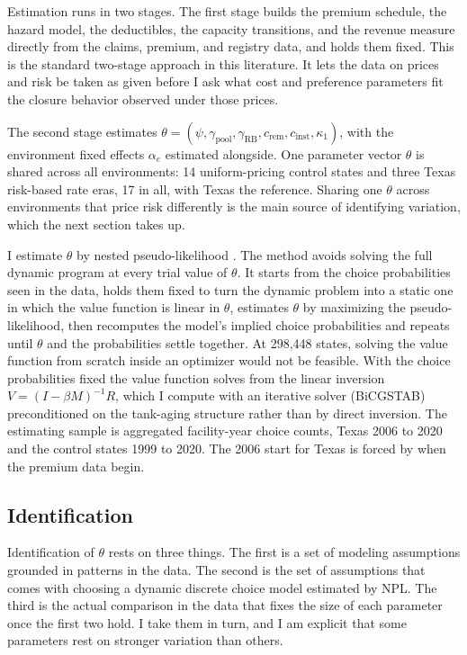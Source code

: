 \documentclass[
  12pt,
]{article}
\begin{document}
Estimation runs in two stages. The first stage builds the premium
schedule, the hazard model, the deductibles, the capacity transitions,
and the revenue measure directly from the claims, premium, and registry
data, and holds them fixed. This is the standard two-stage approach in
this literature. It lets the data on prices and risk be taken as given
before I ask what cost and preference parameters fit the closure
behavior observed under those prices.

The second stage estimates
\(\theta=(\psi,\gamma_{\text{pool}},\gamma_{\text{RB}},c_{\text{rem}},c_{\text{inst}},\kappa_1)\),
with the environment fixed effects \(\alpha_e\) estimated alongside. One
parameter vector \(\theta\) is shared across all environments: 14
uniform-pricing control states and three Texas risk-based rate eras, 17
in all, with Texas the reference. Sharing one \(\theta\) across
environments that price risk differently is the main source of
identifying variation, which the next section takes up.

I estimate \(\theta\) by nested pseudo-likelihood
\citep{aguirregabiria_sequential_2007}. The method avoids solving the
full dynamic program at every trial value of \(\theta\). It starts from
the choice probabilities seen in the data, holds them fixed to turn the
dynamic problem into a static one in which the value function is linear
in \(\theta\), estimates \(\theta\) by maximizing the pseudo-likelihood,
then recomputes the model's implied choice probabilities and repeats
until \(\theta\) and the probabilities settle together. At 298,448
states, solving the value function from scratch inside an optimizer
would not be feasible. With the choice probabilities fixed the value
function solves from the linear inversion \(V=(I-\beta M)^{-1}R\), which
I compute with an iterative solver (BiCGSTAB) preconditioned on the
tank-aging structure rather than by direct inversion. The estimating
sample is aggregated facility-year choice counts, Texas 2006 to 2020 and
the control states 1999 to 2020. The 2006 start for Texas is forced by
when the premium data begin.

\subsection{Identification}\label{identification}

Identification of \(\theta\) rests on three things. The first is a set
of modeling assumptions grounded in patterns in the data. The second is
the set of assumptions that comes with choosing a dynamic discrete
choice model estimated by NPL. The third is the actual comparison in the
data that fixes the size of each parameter once the first two hold. I
take them in turn, and I am explicit that some parameters rest on
stronger variation than others.
\end{document}
